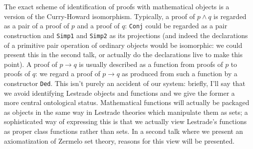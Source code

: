 \documentclass{slides}
\begin{document}
\begin{slide}
The exact scheme of identification of proofs with mathematical objects is a version of the Curry-Howard isomorphism.  Typically, a proof of $p \wedge q$ is regarded as a pair of a proof of $p$ and a proof of $q$:  {\tt Conj} could be regarded as a pair construction and {\tt Simp1} and {\tt Simp2} as its projections (and indeed the declarations of a primitive pair operation
of ordinary objects would be isomorphic:  we could present this in the second talk, or actually do the declarations live to make this point).  A proof of $p \rightarrow q$
is usually described as a function from proofs of $p$ to proofs of $q$:  we regard a proof of $p \rightarrow q$ as produced from such a function by a constructor {\tt Ded}.
This isn't purely an accident of our system:  briefly, I'll say that we avoid identifying Lestrade objects and functions and we give the former a more central ontological status.
Mathematical functions will actually be packaged as objects in the same way in Lestrade theories which manipulate them as sets;  a sophisticated way of expressing this
is that we actually view Lestrade's functions as proper class functions rather than sets.  In a second talk where we present an axiomatization of Zermelo set theory, reasons for this view will be presented.

\end{slide}
\end{document}
